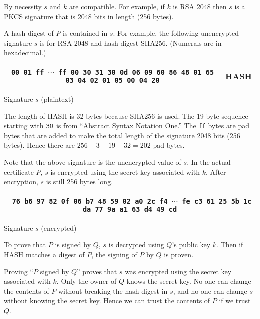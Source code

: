 \documentclass[12pt]{article}
\begin{document}
\noindent
By necessity $s$ and $k$ are compatible.
For example, if $k$ is RSA 2048 then $s$ is a PKCS signature that is 2048 bits in length
(256 bytes).

\bigskip
\noindent
A hash digest of $P$ is contained in $s$.
For example, the following unencrypted signature $s$ is for RSA 2048 and hash digest SHA256.
(Numerals are in hexadecimal.)

\begin{center}
\begin{tabular}{|c|c|}
\hline
{\footnotesize\tt 00 01 ff $\cdots$ ff 00 30 31 30 0d 06 09 60 86 48 01 65 03 04 02 01 05 00 04 20} & HASH\\
\hline
\end{tabular}

\medskip
Signature $s$ (plaintext)
\end{center}

\noindent
The length of HASH is 32 bytes because SHA256 is used.
The 19 byte sequence starting with $\tt 30$ is from
``Abstract Syntax Notation One.''
The {\tt ff} bytes are pad bytes that are added to make the total length of the signature 2048 bits (256 bytes).
Hence there are $256-3-19-32=202$ pad bytes.

\bigskip
\noindent
Note that the above signature is the unencrypted value of $s$.
In the actual certificate $P$, $s$ is encrypted using the secret key associated with $k$.
After encryption, $s$ is still 256 bytes long.

\begin{center}
\begin{tabular}{|c|}
\hline
{\footnotesize\tt
76 b6 97 82 0f 06 b7 48 59 02 a0 2c f4 $\cdots$
fe c3 61 25 5b 1c da 77 9a a1 63 d4 49 cd}\\
\hline
\end{tabular}

\medskip
Signature $s$ (encrypted)
\end{center}

\noindent
To prove that $P$ is signed by $Q$, $s$ is decrypted using $Q$'s public key $k$.
Then if HASH matches a digest of $P$, the signing of $P$ by $Q$ is proven.

\bigskip
\noindent
Proving ``$P$ signed by $Q$'' proves that $s$ was encrypted using the secret key associated with $k$.
Only the owner of $Q$ knows the secret key.
No one can change the contents of $P$ without breaking the hash digest in $s$,
and no one can change $s$ without knowing the secret key.
Hence we can trust the contents of $P$ if we trust $Q$.
\end{document}

